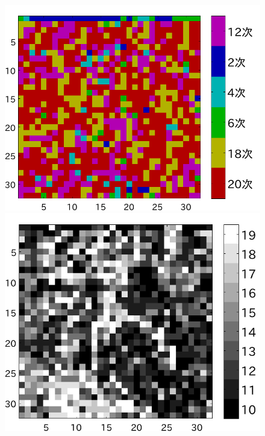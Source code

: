 \documentclass[25pt,landscape,dvipdfmx,uplatex]{foils}
\begin{document}
\begin{figure}[b]
\begin{flushleft}
\vspace{-1cm}
\includegraphics[angle=-90,scale=0.75]{fig/test1/b16/yosokusikino.pdf}
\includegraphics[angle=-90,scale=0.75]{fig/test1/b16/yosokusikihaba.pdf}

\end{flushleft}
\end{figure}
\end{document}
